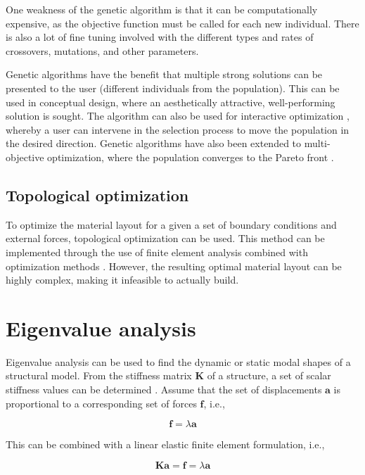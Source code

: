 One weakness of the genetic algorithm is that it can be computationally expensive, as the objective function must be called for each new individual. There is also a lot of fine tuning involved with the different types and rates of crossovers, mutations, and other parameters. 

Genetic algorithms have the benefit that multiple strong solutions can be presented to the user (different individuals from the population). This can be used in conceptual design, where an aesthetically attractive, well-performing solution is sought. The algorithm can also be used for interactive optimization \cite{Scott2002}, whereby a user can intervene in the selection process to move the population in the desired direction. Genetic algorithms have also been extended to multi-objective optimization, where the population converges to the Pareto front \cite{deb2002fast}.

\subsection{Topological optimization}
To optimize the material layout for a given a set of boundary conditions and external forces, topological optimization can be used. This method can be implemented through the use of finite element analysis combined with optimization methods \cite{bendsoe2009topology}. However, the resulting optimal material layout can be highly complex, making it infeasible to actually build.

\section{Eigenvalue analysis}
Eigenvalue analysis can be used to find the dynamic or static modal shapes of a structural model. From the stiffness matrix $\mathbf{K}$ of a structure, a set of scalar stiffness values can be determined \cite{Olsson2003}. Assume that the set of displacements $\mathbf{a}$ is proportional to a corresponding set of forces $\mathbf{f}$, i.e.,

\begin{equation*}
\mathbf{f} = \lambda \mathbf{a}
\end{equation*}

This can be combined with a linear elastic finite element formulation, i.e.,

\begin{equation*}
\mathbf{Ka} =\mathbf{f} = \lambda \mathbf{a}
\end{equation*}

